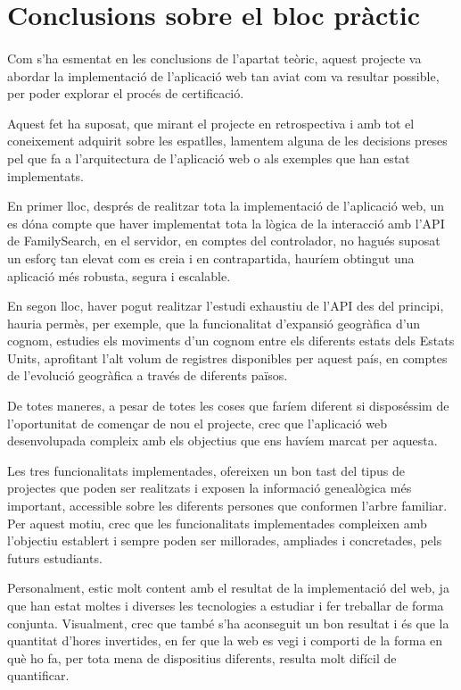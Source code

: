 \section{Conclusions sobre el bloc pràctic}

    \paragraph{}
    Com s’ha esmentat en les conclusions de l’apartat teòric, aquest projecte va abordar la implementació de l’aplicació web tan aviat com va resultar possible, per poder explorar el procés de certificació.

    Aquest fet ha suposat, que mirant el projecte en retrospectiva i amb tot el conei\-xe\-ment adquirit sobre les espatlles, lamentem alguna de les decisions preses pel que fa a l’arquitectura de l’aplicació web o als exemples que han estat implementats.

    En primer lloc, després de realitzar tota la implementació de l’aplicació web, un es dóna compte que haver implementat tota la lògica de la interacció amb l’API de FamilySearch, en el servidor, en comptes del controlador, no hagués suposat un esforç tan elevat com es creia i en contrapartida, hauríem obtingut una aplicació més robusta, segura i escalable.

    En segon lloc, haver pogut realitzar l’estudi exhaustiu de l’API des del principi, hauria permès, per exemple, que la funcionalitat d’expansió geogràfica d’un cognom, estudies els moviments d’un cognom entre els diferents estats dels Estats Units, aprofitant l’alt volum de registres disponibles per aquest país, en comptes de l’evolució geogràfica a través de diferents països.

    De totes maneres, a pesar de totes les coses que faríem diferent si disposéssim de l’oportunitat de començar de nou el projecte, crec que l’aplicació web desenvolupada compleix amb els objectius que ens havíem marcat per aquesta.

    Les tres funcionalitats implementades, ofereixen un bon tast del tipus de projectes que poden ser realitzats i exposen la informació genealògica més important, accessible sobre les diferents persones que conformen l’arbre familiar. Per aquest motiu, crec que les funcionalitats implementades compleixen amb l’objectiu establert i sempre poden ser millorades, ampliades i concretades, pels futurs estudiants.

    Personalment, estic molt content amb el resultat de la implementació del web, ja que han estat moltes i diverses les tecnologies a estudiar i fer treballar de forma conjunta. Visualment, crec que també s’ha aconseguit un bon resultat i és que la quantitat d’hores invertides, en fer que la web es vegi i comporti de la forma en què ho fa, per tota mena de dispositius diferents, resulta molt difícil de quantificar.

